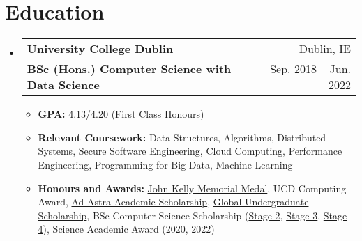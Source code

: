 \documentclass[letterpaper,11pt]{article}
\makeatletter
\newcommand{\cvItem}[1]{
	\item\small{
		{#1 \vspace{-2pt}}
	}
}
\newcommand{\cvSubheading}[4]{
	\vspace{-2pt}\item
	\begin{tabular*}{0.97\textwidth}[t]{l@{\extracolsep{\fill}}r}
		\textbf{#1} & #2 \\
		{#3} & #4 \\
	\end{tabular*}\vspace{-7pt}
}
\newcommand{\cvSubHeadingListStart}{\begin{itemize}[leftmargin=0.15in, label={}]}
\newcommand{\cvSubHeadingListEnd}{\end{itemize}}
\newcommand{\cvItemListStart}{\begin{itemize}}
\newcommand{\cvItemListEnd}{\end{itemize}\vspace{-1pt}}
\makeatother
\begin{document}
\section{Education}
\cvSubHeadingListStart
\cvSubheading
{\href{https://www.ucd.ie/cs/}{University College Dublin}}{Dublin, IE}
{\textbf{BSc (Hons.) Computer Science with Data Science}}{Sep. 2018 -- Jun. 2022}

\cvItemListStart
\cvItem{\textbf{GPA:} 4.13/4.20 (First Class Honours)}
\cvItem{\textbf{Relevant Coursework:}
	Data Structures, Algorithms,
	Distributed Systems,
	Secure Software Engineering,
	Cloud Computing,
	Performance Engineering,
	Programming for Big Data,
	Machine Learning}

\cvItem{\textbf{Honours and Awards:}
	\href{https://hub.ucd.ie/usis/W_HU_REPORTING.P_DISPLAY_QUERY?p_query=SC101-1A&p_parameters=06EC1B771E596A89BFDBC88ED2A4CD5FE3644D47681FC679BB3F9EA17BDCE18F9E287F88DADE8251104AACCF5F24340ABC2A8F5720324A16D27BD3CE6524948567F638C5C96DBF05FFCDD04D5F442941F02603CE3C2B1652F3985C232B4D3E543282C59281755AB650603A9D85BF41D6}{John Kelly Memorial Medal},
	UCD Computing Award,
	\href{https://www.ucd.ie/adastraacademy/academic/}{Ad Astra Academic Scholarship},
	\href{https://www.ucd.ie/global/scholarships/}{Global Undergraduate Scholarship},
	BSc Computer Science Scholarship
	(\href{https://sisweb.ucd.ie/usis/W_HU_REPORTING.P_DISPLAY_QUERY?p_query=SC101-1A&p_parameters=A8A08F4E214445171B5771A1009E1D5B2E8D2BA93239FA8867648F2551D1F6E74111E7B3FBB422649785AC454612F967929BC94109BC9FA35BEAD1F53D23BA161359586343D3237CFDBE22184AE066F37B92C3B3C7382336AC2A2EAE5A092F63FC7A402CF2646B9597CDAAB378E40E1B}{Stage 2},
	\href{https://sisweb.ucd.ie/usis/W_HU_REPORTING.P_DISPLAY_QUERY?p_query=SC101-1A&p_parameters=A8A08F4E214445171B5771A1009E1D5B2E8D2BA93239FA8867648F2551D1F6E74111E7B3FBB422649785AC454612F96787A57507118273967D6FD3CA5758624C79D7843C965FDFB69E23ABD0A5BF3B8352A54C50CBC563B72C4800831552834F550B235F0EFC644A6070F3328CE618D803B3E3CD94D6ADF3C463A5184F86FFAB}{Stage 3},
	\href{https://hub.ucd.ie/usis/W_HU_REPORTING.P_DISPLAY_QUERY?p_query=SC101-1A&p_parameters=A8A08F4E214445171B5771A1009E1D5B2E8D2BA93239FA8867648F2551D1F6E74111E7B3FBB422649785AC454612F967AB057463726BFBD2F44F7545DFDE90BF68E76434A9F3F66B2D7280F061B44E47A154491B75B29B1C35AD7E6301B396F3181188D61C833A62D3514A39A8EAC1C1452649CCC93B578B2A8394D0736947AF}{Stage 4}),
	Science Academic Award (2020, 2022)}
\cvItemListEnd
\cvSubHeadingListEnd

\end{document}
